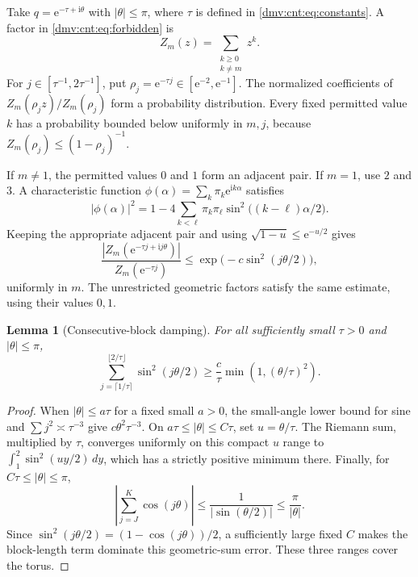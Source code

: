 \documentclass[11pt,letterpaper]{article}
\numberwithin{equation}{section}
\newtheorem{lemma}[theorem]{Lemma}
\theoremstyle{definition}\newtheorem{definition}[theorem]{Definition}
\theoremstyle{remark}\newtheorem{remark}[theorem]{Remark}
\newcommand{\ii}{\mathrm i}
\newcommand{\ee}{\mathrm e}
\begin{document}
Take $q=\ee^{-\tau+\ii\theta}$ with $|\theta|\le\pi$, where $\tau$ is defined in \eqref{dmv:cnt:eq:constants}. A factor in \eqref{dmv:cnt:eq:forbidden} is
\[
Z_m(z)=\sum_{\substack{k\ge0\\k\ne m}}z^k.
\]
For $j\in[\tau^{-1},2\tau^{-1}]$, put $\rho_j=\ee^{-\tau j}\in[\ee^{-2},\ee^{-1}]$. The normalized coefficients of $Z_m(\rho_j z)/Z_m(\rho_j)$ form a probability distribution. Every fixed permitted value $k$ has a probability bounded below uniformly in $m,j$, because $Z_m(\rho_j)\le(1-\rho_j)^{-1}$.

If $m\ne1$, the permitted values $0$ and $1$ form an adjacent pair. If $m=1$, use $2$ and $3$. A characteristic function $\phi(\alpha)=\sum_k\pi_k\ee^{\ii k\alpha}$ satisfies
\begin{equation}\label{dmv:cnt:eq:characteristic}
|\phi(\alpha)|^2
=1-4\sum_{k<\ell}\pi_k\pi_\ell\sin^2\bigl((k-\ell)\alpha/2\bigr).
\end{equation}
Keeping the appropriate adjacent pair and using $\sqrt{1-u}\le\ee^{-u/2}$ gives
\begin{equation}\label{dmv:cnt:eq:factor-damping}
\frac{|Z_m(\ee^{-\tau j+\ii j\theta})|}{Z_m(\ee^{-\tau j})}
\le\exp\bigl(-c\sin^2(j\theta/2)\bigr),
\end{equation}
uniformly in $m$. The unrestricted geometric factors satisfy the same estimate, using their values $0,1$.

\begin{lemma}[Consecutive-block damping]\label{dmv:cnt:lem:block}
For all sufficiently small $\tau>0$ and $|\theta|\le\pi$,
\begin{equation}\label{dmv:cnt:eq:block}
\sum_{j=\lceil1/\tau\rceil}^{\lfloor2/\tau\rfloor}\sin^2(j\theta/2)
\ge\frac c\tau\min\left(1,(\theta/\tau)^2\right).
\end{equation}
\end{lemma}
\begin{proof}
When $|\theta|\le a\tau$ for a fixed small $a>0$, the small-angle lower bound for sine and $\sum j^2\asymp\tau^{-3}$ give $c\theta^2\tau^{-3}$. On $a\tau\le|\theta|\le C\tau$, set $u=\theta/\tau$. The Riemann sum, multiplied by $\tau$, converges uniformly on this compact $u$ range to $\int_1^2\sin^2(uy/2)\,dy$, which has a strictly positive minimum there. Finally, for $C\tau\le|\theta|\le\pi$,
\[
\left|\sum_{j=J}^K\cos(j\theta)\right|
\le\frac1{|\sin(\theta/2)|}\le\frac\pi{|\theta|}.
\]
Since $\sin^2(j\theta/2)=(1-\cos(j\theta))/2$, a sufficiently large fixed $C$ makes the block-length term dominate this geometric-sum error. These three ranges cover the torus.
\end{proof}
\end{document}
